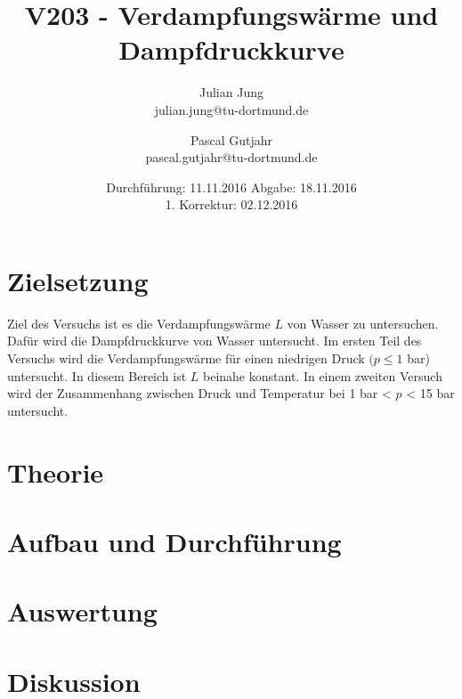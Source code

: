 

\title{V203 - Verdampfungswärme und Dampfdruckkurve}
\author{Julian Jung \\ julian.jung@tu-dortmund.de
  \and Pascal Gutjahr \\ pascal.gutjahr@tu-dortmund.de}
  \date{Durchführung: 11.11.2016
  \hspace{3em}
  Abgabe: 18.11.2016 \\
  1. Korrektur: 02.12.2016}
  
\maketitle
\newpage
\tableofcontents
\newpage
\section{Zielsetzung}
Ziel des Versuchs ist es die Verdampfungswärme $L$ von Wasser zu untersuchen.
Dafür wird die Dampfdruckkurve von Wasser untersucht. Im ersten Teil des Versuchs
wird die Verdampfungswärme für einen niedrigen Druck $(p\le 1$ bar) untersucht. In
diesem Bereich ist $L$ beinahe konstant. In einem zweiten Versuch wird der Zusammenhang
zwischen Druck und Temperatur bei 1 bar < $p$ < 15 bar untersucht.
\section{Theorie}

\section{Aufbau und Durchführung}

\section{Auswertung}

\section{Diskussion}

\printbibliography

